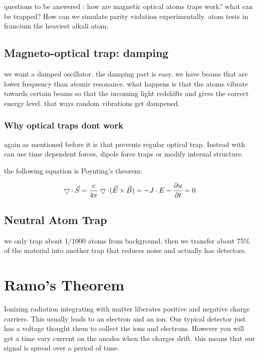 \documentclass[english, 11pt]{article}
\begin{document}
questions to be answered : how are magnetic optical atoms traps work? what can be trapped? How can we simulate parity violation experimentally.
atom tests in francium the heaviest alkali atom.

\subsection{Magneto-optical trap: damping}

we want a damped oscillator. the damping part is easy. we have beams that are lower frequency than atomic resonance. what happens is that the atoms vibrate towards certain beams so that the incoming light redshifts and gives the correct energy level. that ways random vibrations get dampened.

\subsubsection{Why optical traps dont work}

again as mentioned before it is  that prevents regular optical trap. Instead with can use time dependent forces, dipole force traps or modify internal structure.

the following equation is Poynting's theorem:

\[ \bigtriangledown \cdot \vec{S} = \frac{c}{4\pi}\bigtriangledown \cdot (\vec{E} \times \vec{B}) = -J\cdot E - \frac{\partial u}{\partial t} = 0 \]

\subsection{Neutral Atom Trap}

we only trap about 1/1000 atoms from background. then we transfer about 75\% of the material into another trap that reduces noise and actually has detectors.

\section{Ramo's Theorem}

Ionizing radiation integrating with matter liberates positive and negative charge carriers. This usually leads to an electron and an ion. Our typical detector just has a voltage thought them to collect the ions and electrons. However you will get a time vary current on the anodes when the charges drift. this means that our signal is spread over a period of time.
\end{document}
